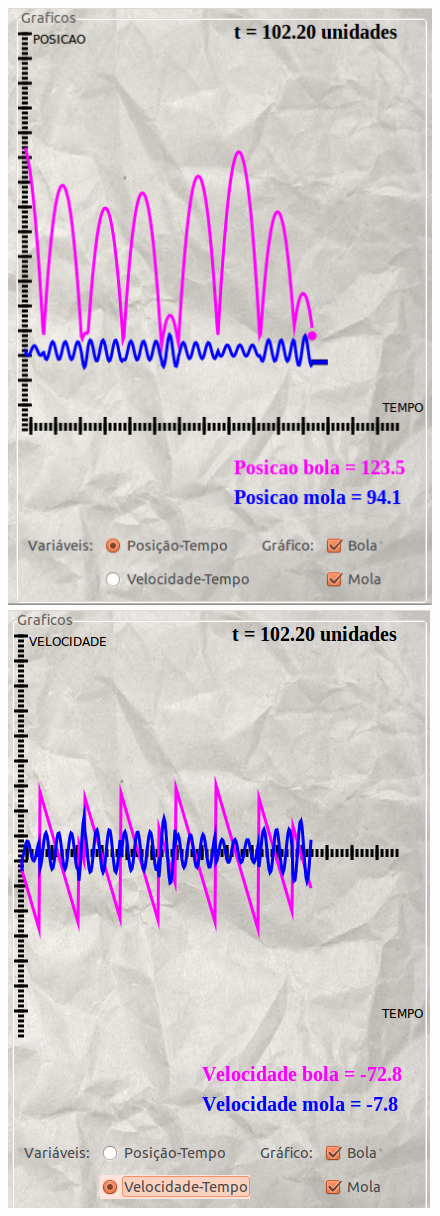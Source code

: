 \documentclass[defaultstyle,12pt]{report}
\begin{document}
\begin{figure}[!htb]
\begin{center}
\includegraphics[scale=0.45]{grafico1.png}
\includegraphics[scale=0.45]{grafico2.png}
\end{center}
\end{figure}
\end{document}
